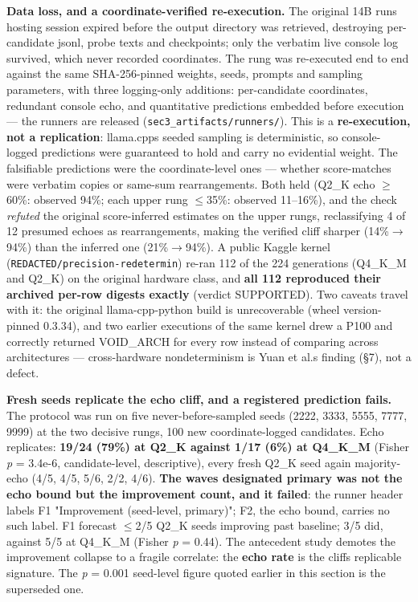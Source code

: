 \textbf{Data loss, and a coordinate-verified re-execution.} The original 14B run\textquotesingle s hosting session expired before the output directory was retrieved, destroying per-candidate jsonl, probe texts and checkpoints; only the verbatim live console log survived, which never recorded coordinates. The rung was re-executed end to end against the same SHA-256-pinned weights, seeds, prompts and sampling parameters, with three logging-only additions: per-candidate coordinates, redundant console echo, and quantitative predictions embedded before execution --- the runners are released (\texttt{sec3\_artifacts/runners/}). This is a \textbf{re-execution, not a replication}: llama.cpp\textquotesingle s seeded sampling is deterministic, so console-logged predictions were guaranteed to hold and carry no evidential weight. The falsifiable predictions were the coordinate-level ones --- whether score-matches were verbatim copies or same-sum rearrangements. Both held (Q2\_K echo \(\geq\)60\%: observed 94\%; each upper rung \(\leq\)35\%: observed 11--16\%), and the check \emph{refuted} the original score-inferred estimates on the upper rungs, reclassifying 4 of 12 presumed echoes as rearrangements, making the verified cliff sharper (14\%\(\rightarrow\)94\%) than the inferred one (21\%\(\rightarrow\)94\%). A public Kaggle kernel (\texttt{REDACTED/precision-redetermin}) re-ran 112 of the 224 generations (Q4\_K\_M and Q2\_K) on the original hardware class, and \textbf{all 112 reproduced their archived per-row digests exactly} (verdict SUPPORTED). Two caveats travel with it: the original llama-cpp-python build is unrecoverable (wheel version-pinned 0.3.34), and two earlier executions of the same kernel drew a P100 and correctly returned VOID\_ARCH for every row instead of comparing across architectures --- cross-hardware nondeterminism is Yuan et al.\textquotesingle s finding (§7), not a defect.

\textbf{Fresh seeds replicate the echo cliff, and a registered prediction fails.} The protocol was run on five never-before-sampled seeds (2222, 3333, 5555, 7777, 9999) at the two decisive rungs, 100 new coordinate-logged candidates. Echo replicates: \textbf{19/24 (79\%) at Q2\_K against 1/17 (6\%) at Q4\_K\_M} (Fisher \emph{p} = 3.4e-6, candidate-level, descriptive), every fresh Q2\_K seed again majority-echo (4/5, 4/5, 5/6, 2/2, 4/6). \textbf{The wave\textquotesingle s designated primary was not the echo bound but the improvement count, and it failed}: the runner header labels F1 "Improvement (seed-level, primary)"; F2, the echo bound, carries no such label. F1 forecast \(\leq\)2/5 Q2\_K seeds improving past baseline; 3/5 did, against 5/5 at Q4\_K\_M (Fisher \emph{p} = 0.44). The antecedent study demotes the improvement collapse to a fragile correlate: the \textbf{echo rate} is the cliff\textquotesingle s replicable signature. The \emph{p} = 0.001 seed-level figure quoted earlier in this section is the superseded one.

